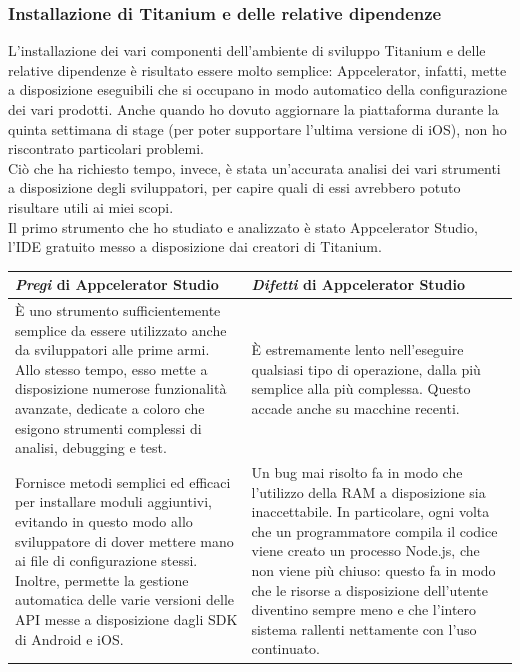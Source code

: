 			\subsubsection{Installazione di Titanium e delle relative dipendenze}
				L'installazione dei vari componenti dell'ambiente di sviluppo Titanium e delle relative dipendenze è risultato
				essere molto semplice: Appcelerator, infatti, mette a disposizione eseguibili che si occupano in modo automatico
				della configurazione dei vari prodotti. Anche quando ho dovuto aggiornare la piattaforma durante la quinta settimana
				di stage (per poter supportare l'ultima versione di iOS), non ho riscontrato particolari problemi.\\
				Ciò che ha richiesto tempo, invece, è stata un'accurata analisi dei vari strumenti a disposizione degli sviluppatori,
				per capire quali di essi avrebbero potuto risultare utili ai miei scopi.\\
				Il primo strumento che ho studiato e analizzato è stato Appcelerator Studio, l'IDE gratuito messo a disposizione dai
				creatori di Titanium.
				\begin{center}
					\begin{tabular}[H]{| p{0.43\textwidth} | p{} |}
						\hline
						\emph{Pregi} di Appcelerator Studio &
						\emph{Difetti} di Appcelerator Studio\\
						\hline\hline
						È uno strumento sufficientemente semplice da essere utilizzato anche da sviluppatori alle prime armi.
						Allo stesso tempo, esso mette a disposizione numerose funzionalità avanzate, dedicate a coloro che
						esigono strumenti complessi di analisi, debugging e test. &
						È estremamente lento nell'eseguire qualsiasi tipo di operazione, dalla più semplice alla più
						complessa. Questo accade anche su macchine recenti.\\
						\hline
						Fornisce metodi semplici ed efficaci per installare moduli aggiuntivi, evitando in questo modo allo
						sviluppatore di dover mettere mano ai file di configurazione stessi. Inoltre, permette la gestione
						automatica delle varie versioni delle API messe a disposizione dagli SDK di Android e iOS. &
						Un bug mai risolto fa in modo che l'utilizzo della RAM a disposizione sia inaccettabile. In
						particolare, ogni volta che un programmatore compila il codice viene creato un processo Node.js, che
						non viene più chiuso: questo fa in modo che le risorse a disposizione dell'utente diventino sempre
						meno e che l'intero sistema rallenti nettamente con l'uso continuato.\\
						\hline
					\end{tabular}
				\end{center}
